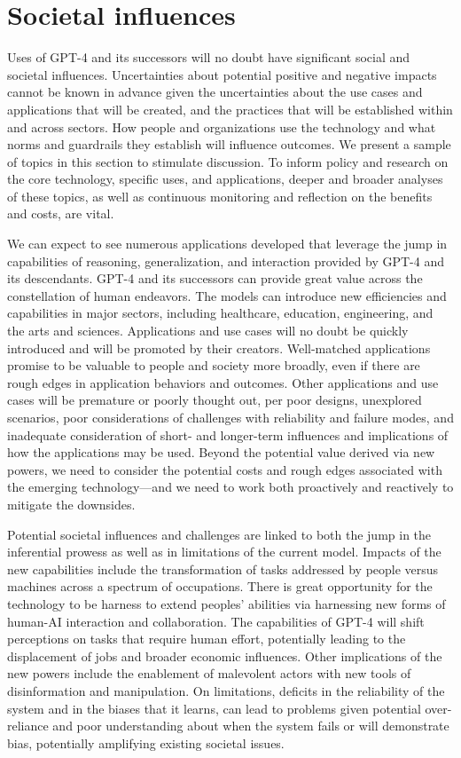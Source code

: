 \section{Societal influences}
\label{sec:societal}

Uses of {GPT-4} and its successors will no doubt have significant social and societal influences. Uncertainties about potential positive and negative impacts cannot be known in advance given the uncertainties about the use cases and applications that will be created, and the practices that will be established within and across sectors. How people and organizations use the technology and what norms and guardrails they establish will influence outcomes. We present a sample of topics in this section to stimulate discussion. To inform policy and research on the core technology, specific uses, and applications, deeper and broader analyses of these topics, as well as continuous monitoring and reflection on the benefits and costs, are vital.

We can expect to see numerous applications developed that leverage the jump in capabilities of reasoning, generalization, and interaction provided by {GPT-4} and its descendants. {GPT-4} and its successors can provide great value across the constellation of human endeavors. The models can introduce new efficiencies and capabilities in major sectors, including healthcare, education, engineering, and the arts and sciences. Applications and use cases will no doubt be quickly introduced and will be promoted by their creators. Well-matched applications promise to be valuable to people and society more broadly, even if there are rough edges in application behaviors and outcomes. Other applications and use cases will be premature or poorly thought out, per poor designs, unexplored scenarios, poor considerations of challenges with reliability and failure modes, and inadequate consideration of short- and longer-term influences and implications of how the applications may be used. Beyond the potential value derived via new powers, we need to consider the potential costs and rough edges associated with the emerging technology---and we need to work both proactively and reactively to mitigate the downsides.

Potential societal influences and challenges are linked to both the jump in the inferential prowess as well as in limitations of the current model.  Impacts of the new capabilities include the transformation of  tasks addressed by people versus machines across a spectrum of occupations. There is great opportunity for the technology to be harness to extend peoples' abilities via harnessing new forms of human-AI interaction and collaboration. The capabilities of {GPT-4} will shift perceptions on tasks that require human effort, potentially leading to the displacement of jobs and broader economic influences. Other implications of the new powers include the enablement of malevolent actors with new tools of disinformation and manipulation.  On limitations, deficits in the reliability of the system and in the biases that it learns, can lead to problems given potential over-reliance and poor understanding about when the system fails or will demonstrate bias, potentially amplifying existing societal issues.

